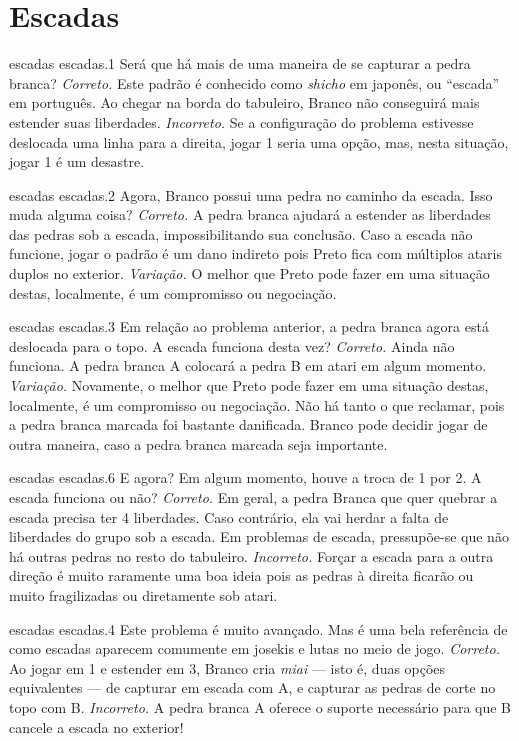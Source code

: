 \chapter{Escadas}

\emptypage

\problemAnswerDiagram
  {escadas}
  {escadas.1}
  {Será que há mais de uma maneira de se capturar a pedra branca?}
  {\emph{Correto.} Este padrão é conhecido como \emph{shicho} em japonês, ou ``escada'' em português. Ao chegar na borda do tabuleiro, Branco não conseguirá mais estender suas liberdades.}
  {\emph{Incorreto.} Se a configuração do problema estivesse deslocada uma linha para a direita, jogar 1 seria uma opção, mas, nesta situação, jogar 1 é um desastre.}

\problemAnswerDiagram
  {escadas}
  {escadas.2}
  {Agora, Branco possui uma pedra no caminho da escada. Isso muda alguma coisa?}
  {\emph{Correto.} A pedra branca ajudará a estender as liberdades das pedras sob a escada, impossibilitando sua conclusão. Caso a escada não funcione, jogar o padrão é um dano indireto pois Preto fica com múltiplos ataris duplos no exterior.}
  {\emph{Variação.} O melhor que Preto pode fazer em uma situação destas, localmente, é um compromisso ou negociação.}

\problemAnswerDiagram
  {escadas}
  {escadas.3}
  {Em relação ao problema anterior, a pedra branca agora está deslocada para o topo. A escada funciona desta vez?}
  {\emph{Correto.} Ainda não funciona. A pedra branca A colocará a pedra B em atari em algum momento.}
  {\emph{Variação.} Novamente, o melhor que Preto pode fazer em uma situação destas, localmente, é um compromisso ou negociação. Não há tanto o que reclamar, pois a pedra branca marcada foi bastante danificada. Branco pode decidir jogar de outra maneira, caso a pedra branca marcada seja importante.}

\problemAnswerDiagram
  {escadas}
  {escadas.6}
  {E agora? Em algum momento, houve a troca de 1 por 2. A escada funciona ou não?}
  {\emph{Correto.} Em geral, a pedra Branca que quer quebrar a escada precisa ter 4 liberdades. Caso contrário, ela vai herdar a falta de liberdades do grupo sob a escada. Em problemas de escada, pressupõe-se que não há outras pedras no resto do tabuleiro.}
  {\emph{Incorreto.} Forçar a escada para a outra direção é muito raramente uma boa ideia pois as pedras à direita ficarão ou muito fragilizadas ou diretamente sob atari.}

\problemAnswerDiagram
  {escadas}
  {escadas.4}
  {Este problema é muito avançado. Mas é uma bela referência de como escadas aparecem comumente em josekis e lutas no meio de jogo.}
  {\emph{Correto.} Ao jogar em 1 e estender em 3, Branco cria  \emph{miai} --- isto é, duas opções equivalentes --- de capturar em escada com A, e capturar as pedras de corte no topo com B.}
  {\emph{Incorreto.} A pedra branca A oferece o suporte necessário para que B cancele a escada no exterior!}

